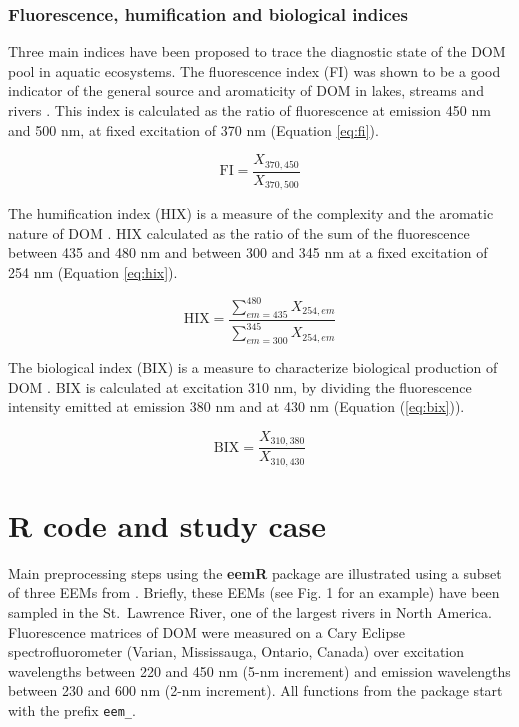 \documentclass[]{book}
\begin{document}
\subsubsection{Fluorescence, humification and biological
indices}\label{fluorescence-humification-and-biological-indices}

Three main indices have been proposed to trace the diagnostic state of
the DOM pool in aquatic ecosystems. The fluorescence index (FI) was
shown to be a good indicator of the general source and aromaticity of
DOM in lakes, streams and rivers \citep{McKnight2001}. This index is
calculated as the ratio of fluorescence at emission 450 nm and 500 nm,
at fixed excitation of 370 nm (Equation \ref{eq:fi}).

\begin{equation}
\text{FI} = \frac{X_{370, 450}}{X_{370, 500}}
\label{eq:fi}
\end{equation}

The humification index (HIX) is a measure of the complexity and the
aromatic nature of DOM \citep{Ohno2002}. HIX calculated as the ratio of
the sum of the fluorescence between 435 and 480 nm and between 300 and
345 nm at a fixed excitation of 254 nm (Equation \ref{eq:hix}).

\begin{equation}
\text{HIX} = \frac{\sum\limits_{em = 435}^{480} X_{254, em}}{\sum\limits_{em = 300}^{345} X_{254, em}}
\label{eq:hix}
\end{equation}

The biological index (BIX) is a measure to characterize biological
production of DOM \citep{Huguet2009}. BIX is calculated at excitation
310 nm, by dividing the fluorescence intensity emitted at emission 380
nm and at 430 nm (Equation (\ref{eq:bix})).

\begin{equation}
\text{BIX} = \frac{X_{310, 380}}{X_{310, 430}}
\label{eq:bix}
\end{equation}

\section{R code and study case}\label{r-code-and-study-case}

Main preprocessing steps using the \textbf{eemR} package are illustrated
using a subset of three EEMs from \citep{Massicotte2011EA}. Briefly,
these EEMs (see Fig. 1 for an example) have been sampled in the
St.~Lawrence River, one of the largest rivers in North America.
Fluorescence matrices of DOM were measured on a Cary Eclipse
spectrofluorometer (Varian, Mississauga, Ontario, Canada) over
excitation wavelengths between 220 and 450 nm (5-nm increment) and
emission wavelengths between 230 and 600 nm (2-nm increment). All
functions from the package start with the prefix
\texttt{\textquotesingle{}eem\_\textquotesingle{}}.
\end{document}
